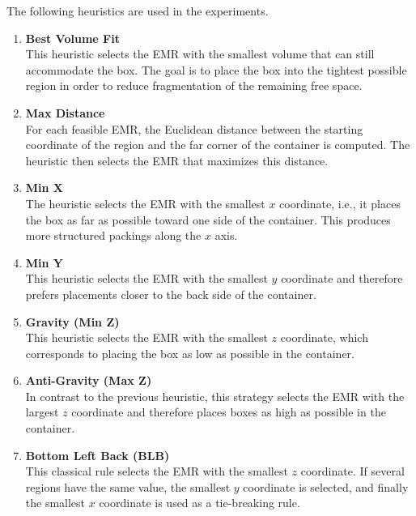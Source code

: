 The following heuristics are used in the experiments.

\begin{enumerate}

\item \textbf{Best Volume Fit} \\
This heuristic selects the EMR with the smallest volume that can still accommodate the box. 
The goal is to place the box into the tightest possible region in order to reduce fragmentation of the remaining free space.

\item \textbf{Max Distance} \\
For each feasible EMR, the Euclidean distance between the starting coordinate of the region and the far corner of the container is computed. 
The heuristic then selects the EMR that maximizes this distance. 

\item \textbf{Min X} \\
The heuristic selects the EMR with the smallest $x$ coordinate, i.e., it places the box as far as possible toward one side of the container. 
This produces more structured packings along the $x$ axis.

\item \textbf{Min Y} \\
This heuristic selects the EMR with the smallest $y$ coordinate and therefore prefers placements closer to the back side of the container.

\item \textbf{Gravity (Min Z)} \\
This heuristic selects the EMR with the smallest $z$ coordinate, which corresponds to placing the box as low as possible in the container. 

\item \textbf{Anti-Gravity (Max Z)} \\
In contrast to the previous heuristic, this strategy selects the EMR with the largest $z$ coordinate and therefore places boxes as high as possible in the container. 

\item \textbf{Bottom Left Back (BLB)} \\
This classical rule selects the EMR with the smallest $z$ coordinate. If several regions have the same value, the smallest $y$ coordinate is selected, and finally the smallest $x$ coordinate is used as a tie-breaking rule. 

\end{enumerate}

